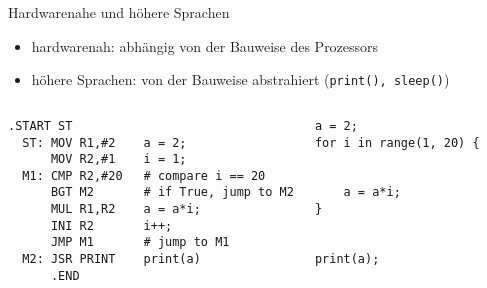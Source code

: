 \begin{frame}[fragile]{Hardwarenahe und höhere Sprachen}
\begin{itemize}
    \item hardwarenah: abhängig von der Bauweise des Prozessors
    \item höhere Sprachen: von der Bauweise abstrahiert (\texttt{print(), sleep()})
\end{itemize}
\begin{columns}
    \begin{lstlisting}
.START ST
  ST: MOV R1,#2
      MOV R2,#1
  M1: CMP R2,#20
      BGT M2
      MUL R1,R2
      INI R2
      JMP M1
  M2: JSR PRINT
      .END
    \end{lstlisting}
    \begin{lstlisting}

a = 2;
i = 1;
# compare i == 20
# if True, jump to M2
a = a*i;
i++;
# jump to M1
print(a)
    \end{lstlisting}
    \begin{lstlisting}
a = 2;
for i in range(1, 20) {


    a = a*i;
}
 
 
print(a);

    \end{lstlisting}
\end{columns}
\end{frame}

